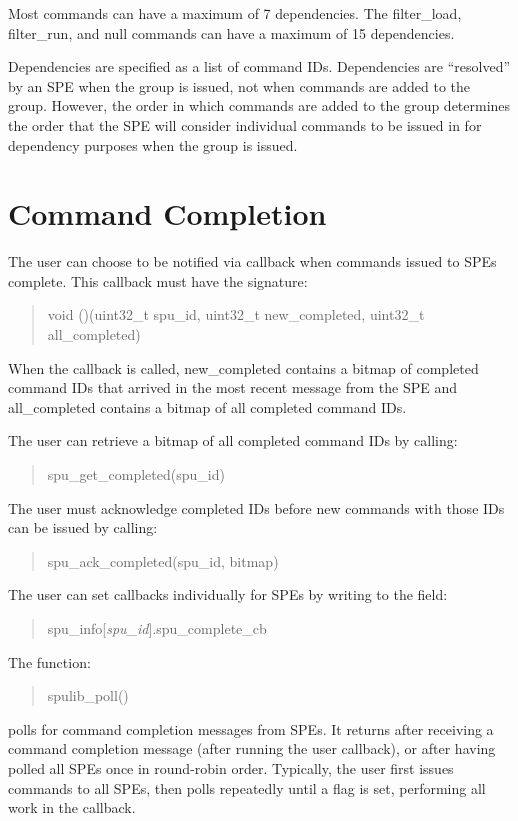 Most commands can have a maximum of 7 dependencies. The \textsf{filter\_load}, \textsf{filter\_run}, and \textsf{null} commands can have a maximum of 15 dependencies.

Dependencies are specified as a list of command IDs. Dependencies are ``resolved'' by an SPE when the group is issued, not when commands are added to the group. However, the order in which commands are added to the group determines the order that the SPE will consider individual commands to be issued in for dependency purposes when the group is issued.

\section{Command Completion}

The user can choose to be notified via callback when commands issued to SPEs complete. This callback must have the signature:
\begin{quote}
\textsf{void ()(uint32\_t spu\_id, uint32\_t new\_completed, uint32\_t all\_completed)}
\end{quote}
When the callback is called, \textsf{new\_completed} contains a bitmap of completed command IDs that arrived in the most recent message from the SPE and \textsf{all\_completed} contains a bitmap of all completed command IDs.

The user can retrieve a bitmap of all completed command IDs by calling:
\begin{quote}
\textsf{spu\_get\_completed(spu\_id)}
\end{quote}
The user must acknowledge completed IDs before new commands with those IDs can be issued by calling:
\begin{quote}
\textsf{spu\_ack\_completed(spu\_id, bitmap)}
\end{quote}

The user can set callbacks individually for SPEs by writing to the field:
\begin{quote}
\textsf{spu\_info[\emph{spu\_id}].spu\_complete\_cb}
\end{quote}

The function:
\begin{quote}
\textsf{spulib\_poll()}
\end{quote}
polls for command completion messages from SPEs. It returns after receiving a command completion message (after running the user callback), or after having polled all SPEs once in round-robin order. Typically, the user first issues commands to all SPEs, then polls repeatedly until a flag is set, performing all work in the callback.


